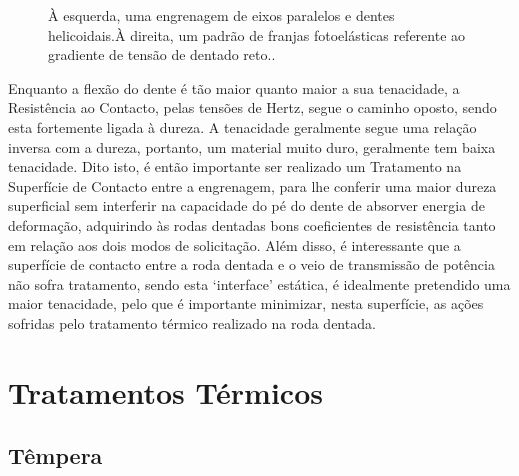 \begin{figure}[htb]
\begin{subfigure}{.5\textwidth}
        \caption{}
        \label{fig:franjas_fotoelásticas}
    \end{subfigure}
\caption[Engrenagem de eixos paralelos e um padrão de franjas fotoelásticas]%
{À esquerda, uma engrenagem de eixos paralelos e dentes helicoidais.À direita, um padrão de franjas fotoelásticas referente ao gradiente de tensão de dentado reto.\cite{Completo2019}.}
\end{figure}
\par  
Enquanto a flexão do dente é tão maior quanto maior a sua tenacidade, a Resistência ao Contacto, pelas tensões de Hertz, segue o caminho oposto, sendo esta fortemente ligada à dureza. A tenacidade geralmente segue uma relação inversa com a dureza, portanto, um material muito duro, geralmente tem baixa tenacidade.
Dito isto, é então importante ser realizado um Tratamento na Superfície de Contacto entre a engrenagem, para lhe conferir uma maior dureza superficial sem interferir na capacidade do pé do dente de absorver energia de deformação, adquirindo às rodas dentadas bons coeficientes de resistência tanto em relação aos dois modos de solicitação. Além disso, é interessante que a superfície de contacto entre a roda dentada e o veio de transmissão de potência não sofra tratamento, sendo esta ‘interface’ estática, é idealmente pretendido uma maior tenacidade, pelo que é importante minimizar, nesta superfície, as ações sofridas pelo tratamento térmico realizado na roda dentada.
\newpage
\section{Tratamentos Térmicos} \label{sec:soa_tratamentos}
\subsection{Têmpera} \label{ssec:soa_tratamentos_tempera}

